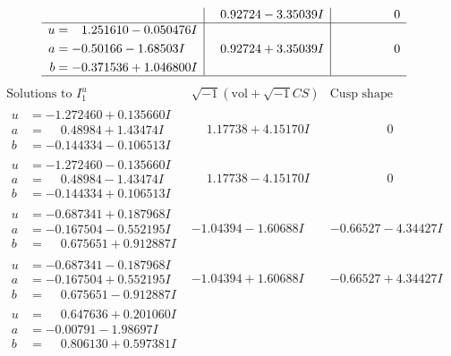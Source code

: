 \documentclass[1p]{elsarticle_modified}
\theoremstyle{definition}
\newcommand{\I}{\sqrt{-1}}
\begin{document}
$$\begin{array}{c|c|c}
 & \phantom{-}0.92724 - 3.35039 I & \phantom{-0.000000 } 0 \\ \hline\begin{aligned}
u &= \phantom{-}1.251610 - 0.050476 I \\
a &= -0.50166 - 1.68503 I \\
b &= -0.371536 + 1.046800 I\end{aligned}
 & \phantom{-}0.92724 + 3.35039 I & \phantom{-0.000000 } 0\\
 \hline 
 \end{array}$$\newpage$$\begin{array}{c|c|c}  
\text{Solutions to }I^u_{1}& \I (\text{vol} + \sqrt{-1}CS) & \text{Cusp shape}\\
 \hline 
\begin{aligned}
u &= -1.272460 + 0.135660 I \\
a &= \phantom{-}0.48984 + 1.43474 I \\
b &= -0.144334 - 0.106513 I\end{aligned}
 & \phantom{-}1.17738 + 4.15170 I & \phantom{-0.000000 } 0 \\ \hline\begin{aligned}
u &= -1.272460 - 0.135660 I \\
a &= \phantom{-}0.48984 - 1.43474 I \\
b &= -0.144334 + 0.106513 I\end{aligned}
 & \phantom{-}1.17738 - 4.15170 I & \phantom{-0.000000 } 0 \\ \hline\begin{aligned}
u &= -0.687341 + 0.187968 I \\
a &= -0.167504 - 0.552195 I \\
b &= \phantom{-}0.675651 + 0.912887 I\end{aligned}
 & -1.04394 - 1.60688 I & -0.66527 - 4.34427 I \\ \hline\begin{aligned}
u &= -0.687341 - 0.187968 I \\
a &= -0.167504 + 0.552195 I \\
b &= \phantom{-}0.675651 - 0.912887 I\end{aligned}
 & -1.04394 + 1.60688 I & -0.66527 + 4.34427 I \\ \hline\begin{aligned}
u &= \phantom{-}0.647636 + 0.201060 I \\
a &= -0.00791 - 1.98697 I \\
b &= \phantom{-}0.806130 + 0.597381 I\end{aligned}

\end{array}$$
\end{document}
